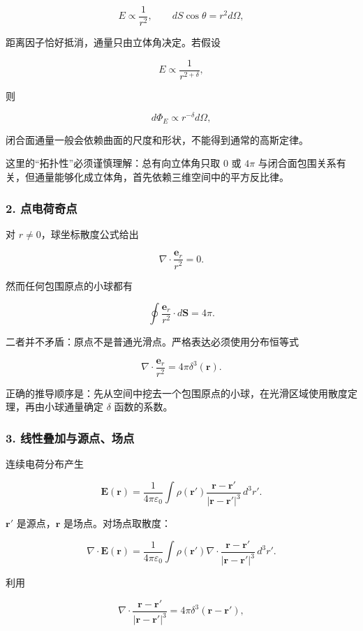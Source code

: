 \[
E\propto\frac1{r^2},
\qquad
dS\cos\theta=r^2d\Omega,
\]

距离因子恰好抵消，通量只由立体角决定。若假设

\[
E\propto\frac1{r^{2+\delta}},
\]

则

\[
d\Phi_E\propto r^{-\delta}d\Omega,
\]

闭合面通量一般会依赖曲面的尺度和形状，不能得到通常的高斯定律。

这里的``拓扑性''必须谨慎理解：总有向立体角只取 \(0\) 或 \(4\pi\)
与闭合面包围关系有关，但通量能够化成立体角，首先依赖三维空间中的平方反比律。

\subsubsection{2. 点电荷奇点}\label{m7:ux70b9ux7535ux8377ux5947ux70b9}

对 \(r\ne0\)，球坐标散度公式给出

\[
\nabla\cdot\frac{\mathbf e_r}{r^2}=0.
\]

然而任何包围原点的小球都有

\[
\oint\frac{\mathbf e_r}{r^2}\cdot d\mathbf S=4\pi.
\]

二者并不矛盾：原点不是普通光滑点。严格表达必须使用分布恒等式

\[
\nabla\cdot\frac{\mathbf e_r}{r^2}
=4\pi\delta^3(\mathbf r).
\]

正确的推导顺序是：先从空间中挖去一个包围原点的小球，在光滑区域使用散度定理，再由小球通量确定
\(\delta\) 函数的系数。

\subsubsection{3.
线性叠加与源点、场点}\label{m7:ux7ebfux6027ux53e0ux52a0ux4e0eux6e90ux70b9ux573aux70b9}

连续电荷分布产生

\[
\mathbf E(\mathbf r)
=\frac1{4\pi\varepsilon_0}
\int
\rho(\mathbf r')
\frac{\mathbf r-\mathbf r'}{|\mathbf r-\mathbf r'|^3}
\,d^3r'.
\]

\(\mathbf r'\) 是源点，\(\mathbf r\) 是场点。对场点取散度：

\[
\nabla\cdot\mathbf E(\mathbf r)
=\frac1{4\pi\varepsilon_0}
\int\rho(\mathbf r')
\nabla\cdot
\frac{\mathbf r-\mathbf r'}{|\mathbf r-\mathbf r'|^3}
\,d^3r'.
\]

利用

\[
\nabla\cdot
\frac{\mathbf r-\mathbf r'}{|\mathbf r-\mathbf r'|^3}
=4\pi\delta^3(\mathbf r-\mathbf r'),
\]

